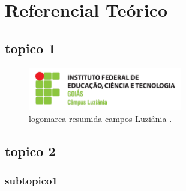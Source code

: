 \chapter{Referencial Teórico}
\label{cap:referencial}

\section{topico 1}
\label{sec:toc1}

\begin{figure}[h]
\centering
\includegraphics[width=0.60\textwidth]{./cls/logo-ifg}
\caption{logomarca resumida campos Luziânia \cite{ifg}.}
\label{fig:ifglogo}
\end{figure}





\section{topico 2}
\label{sec:toc2}
 
 
 \subsection{subtopico1}
\label{ssec:toc2}